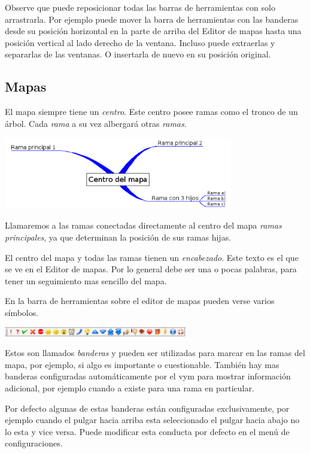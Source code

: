 \documentclass{article}
\newcommand{\vym}{{\sc vym }}
\begin{document}
Observe que puede reposicionar todas las barras de herramientas con solo arrastrarla. Por ejemplo puede mover la barra de herramientas con las banderas desde su posici\'on horizontal en la parte de arriba del Editor de mapas hasta una posici\'on vertical al lado derecho de la ventana. Incluso puede extraerlas y separarlas de las ventanas. O insertarla de nuevo en su posici\'on original.

\subsection{Mapas}
El mapa siempre tiene un {\em centro}. Este centro posee ramas como el tronco de un \'arbol. Cada {\em rama} a su vez albergar\'a otras {\em ramas}.
\begin{center}
    \includegraphics[width=10cm]{images/branches_es.png}
\end{center}
Llamaremos a las ramas conectadas directamente al centro del mapa {\em
ramas principales}, ya que determinan la posici\'on de sus ramas hijas.

El centro del mapa y todas las ramas tienen un {\em encabezado}. Este texto es el que se ve en el Editor de mapas. Por lo general debe ser una o pocas palabras, para tener un seguimiento mas sencillo del mapa.


En la barra de herramientas sobre el editor de mapas pueden verse varios s\'imbolos.
\begin{center}
    \includegraphics[width=8cm]{images/default-flags.png}
\end{center}
Estos son llamados {\em banderas} y pueden ser utilizadas para marcar en las ramas del mapa, por ejemplo, si algo es importante o cuestionable. Tambi\'en hay mas banderas configuradas autom\'aticamente por el \vym para mostrar informaci\'on adicional, por ejemplo cuando a existe para una rama en particular.

Por defecto algunas de estas banderas est\'an configuradas exclusivamente, por ejemplo cuando el pulgar hacia arriba esta seleccionado el pulgar hacia abajo no lo esta y vice versa. Puede modificar esta conducta por defecto en el men\' u de configuraciones.
\end{document}
